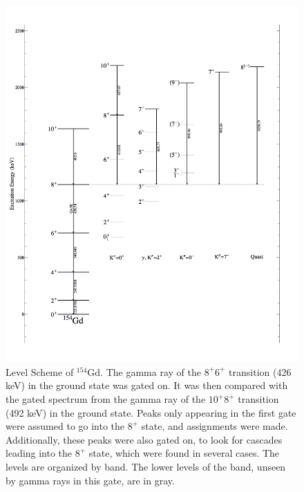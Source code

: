 \begin{figure}[!]
    \centering
    \includegraphics[scale=0.25]{154GdTablesAndFigs/154Gd_8to6.png}
    \caption{Level Scheme of $^{154}$Gd. The gamma ray of the $8^+$\rightarrow$6^+$ transition (426 keV) in the ground state was gated on. It was then compared with the gated spectrum from the gamma ray of the $10^+$\rightarrow$8^+$ transition (492 keV) in the ground state. Peaks only appearing in the first gate were assumed to go into the $8^+$ state, and assignments were made. Additionally, these peaks were also gated on, to look for cascades leading into the $8^+$ state, which were found in several cases. The levels are organized by band. The lower levels of the band, unseen by gamma rays in this gate, are in gray.}
    \label{fig:154_8to6}
\end{figure}